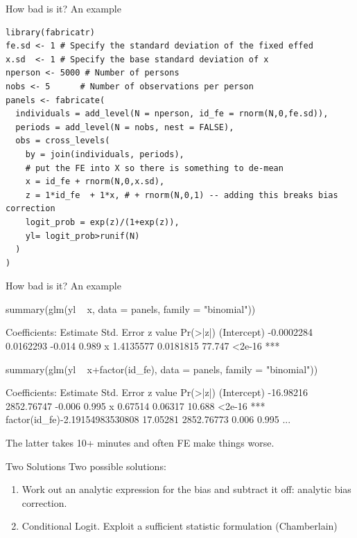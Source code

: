 \documentclass[xcolor=pdftex,dvipsnames,table,mathserif,aspectratio=169]{beamer}
\begin{document}
\begin{frame}[fragile]{How bad is it? An example}
\scriptsize
\begin{verbatim}
library(fabricatr)
fe.sd <- 1 # Specify the standard deviation of the fixed effed
x.sd  <- 1 # Specify the base standard deviation of x
nperson <- 5000 # Number of persons
nobs <- 5      # Number of observations per person
panels <- fabricate(
  individuals = add_level(N = nperson, id_fe = rnorm(N,0,fe.sd)),
  periods = add_level(N = nobs, nest = FALSE),
  obs = cross_levels(
    by = join(individuals, periods),
    # put the FE into X so there is something to de-mean
    x = id_fe + rnorm(N,0,x.sd),
    z = 1*id_fe  + 1*x, # + rnorm(N,0,1) -- adding this breaks bias correction
    logit_prob = exp(z)/(1+exp(z)),
    yl= logit_prob>runif(N)
  )
)
\end{verbatim}
\end{frame}


\begin{frame}[fragile]{How bad is it? An example}
\scriptsize
\begin{semiverbatim}
summary(glm(yl ~ x, data = panels, family = "binomial"))

Coefficients:
              Estimate Std. Error z value Pr(>|z|)    
(Intercept) -0.0002284  0.0162293  -0.014    0.989    
x            \alert{1.4135577}  0.0181815  77.747   <2e-16 ***

summary(glm(yl ~ x+factor(id_fe), data = panels, family = "binomial"))

Coefficients:
                                    Estimate Std. Error z value Pr(>|z|)    
(Intercept)                        -16.98216 2852.76747  -0.006    0.995    
x                                    0.67514    0.06317  10.688   <2e-16 ***
factor(id_fe)-2.19154983530808      17.05281 2852.76773   0.006    0.995 
...
\end{semiverbatim}
The latter takes 10+ minutes and often FE make things worse.
\end{frame}

\begin{frame}{Two Solutions}
Two possible solutions:
\begin{enumerate}
\item Work out an analytic expression for the bias and subtract it off: \alert{analytic bias correction}.
\item Conditional Logit. Exploit a \alert{sufficient statistic} formulation (Chamberlain)
\end{enumerate}
\end{frame}
\end{document}
